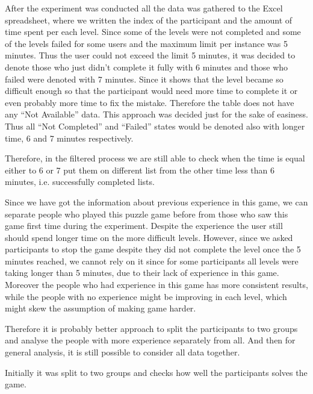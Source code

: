 After the experiment was conducted all the data was gathered to the Excel spreadsheet, where we written the index of the participant and the amount of time spent per each level. Since some of the levels were not completed and some of the levels failed for some users and the maximum limit per instance was 5 minutes. Thus the user could not exceed the limit 5 minutes, it was decided to denote those who just didn’t complete it fully with 6 minutes and those who failed were denoted with 7 minutes. Since it shows that the level became so difficult enough so that the participant would need more time to complete it or even probably more time to fix the mistake. Therefore the table does not have any “Not Available” data. This approach was decided just for the sake of easiness. Thus all “Not Completed” and “Failed” states would be denoted also with longer time, 6 and 7 minutes respectively.

Therefore, in the filtered process we are still able to check when the time is equal either to 6 or 7 put them on different list from the other time less than 6 minutes, i.e. successfully completed lists.

Since we have got the information about previous experience in this game, we can separate people who played this puzzle game before from those who saw this game first time during the experiment. Despite the experience the user still should spend longer time on the more difficult levels. However, since we asked participants to stop the game despite they did not complete the level once the 5 minutes reached, we cannot rely on it since for some participants all levels were taking longer than 5 minutes, due to their lack of experience in this game. Moreover the people who had experience in this game has more consistent results, while the people with no experience might be improving in each level, which might skew the assumption of making game harder.

Therefore it is probably better approach to split the participants to two groups and analyse the people with more experience separately from all. And then for general analysis, it is still possible to consider all data together. 

Initially it was split to two groups and checks how well the participants solves the game.

